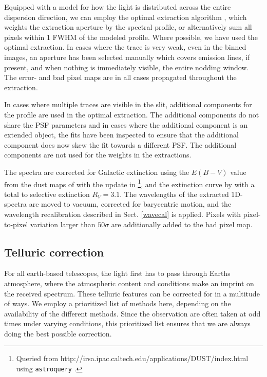 \documentclass{aa}    %
\begin{document}
Equipped with a model for how the light is distributed across the entire
dispersion direction, we can  employ the optimal extraction algorithm
\citep{Horne1986}, which weights the extraction aperture by the spectral profile,
or alternatively sum all pixels within 1 FWHM of the modeled profile. Where
possible, we have used the optimal extraction. In cases where the trace is very
weak, even in the binned images, an aperture has been selected manually which
covers emission lines, if present, and when nothing is immediately visible, the
entire nodding window. The error- and bad pixel maps are in all cases propagated
throughout the extraction.

In cases where multiple traces are visible in the slit, additional components
for the profile are used in the optimal extraction. The additional components do
not share the PSF parameters and in cases where the additional component is an
extended object, the fits have been inspected to ensure that the additional
component does now skew the fit towards a different PSF. The additional
components are not used for the weights in the extractions.

The spectra are corrected for Galactic extinction using the $E(B-V)$ value from
the dust maps of \citet{Schlegel1998} with the update in
\citet{Schlafly2011}\footnote{Queried from
	http://irsa.ipac.caltech.edu/applications/DUST/index.html using \texttt{astroquery}
	\citep{astroquery}.}, and the extinction curve by \cite{Cardelli1989} with a
total to selective extinction $R_V = 3.1$. The wavelengths of the extracted
1D-spectra are moved to vacuum, corrected for barycentric motion, and the
wavelength recalibration described in Sect. \ref{wavecal} is applied. Pixels
with pixel-to-pixel variation larger than $50 \sigma$ are additionally added to
the bad pixel map.


\subsection{Telluric correction} \label{tell_corr}

For all earth-based telescopes, the light first has to pass through Earths
atmosphere, where the atmospheric content and conditions make an imprint on the
received spectrum. These telluric features can be corrected for in a multitude
of ways. We employ a prioritized list of methods here, depending on the
availability of the different methods. Since the observation are often taken at
odd times under varying conditions, this prioritized list ensures that we are
always doing the best possible correction.
\end{document}
